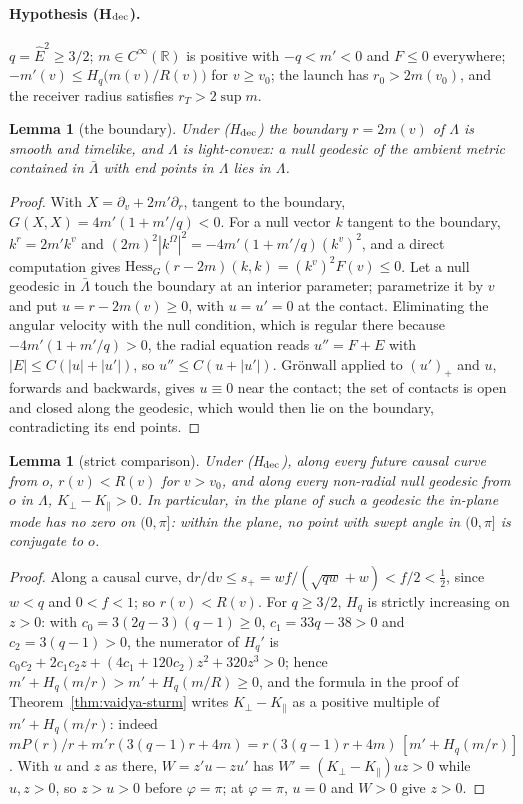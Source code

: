 \documentclass[aip,jmp,amsmath,amssymb,reprint]{revtex4-2}
\newcommand{\Ehat}{\hat E}
\newcommand{\dd}{\mathrm{d}}
\theoremstyle{plain}
\newtheorem{lemma}[proposition]{Lemma}
\theoremstyle{definition}
\begin{document}
\paragraph{Hypothesis (H$_{\rm dec}$).} $q=\Ehat^2\ge3/2$; $m\in C^\infty(\mathbb R)$ is positive with
$-q<m'<0$ and $F\le0$ everywhere; $-m'(v)\le H_q\big(m(v)/R(v)\big)$ for $v\ge v_0$; the launch has
$r_0>2m(v_0)$, and the receiver radius satisfies $r_T>2\sup m$.

\begin{lemma}[the boundary]\label{lem:vaidya-dec-boundary}
Under (H$_{\rm dec}$) the boundary $r=2m(v)$ of $\Lambda$ is smooth and timelike, and $\Lambda$ is light-convex: a
null geodesic of the ambient metric contained in $\bar\Lambda$ with end points in $\Lambda$ lies in $\Lambda$.
\end{lemma}

\begin{proof}
With $X=\partial_v+2m'\partial_r$, tangent to the boundary, $G(X,X)=4m'(1+m'/q)<0$. For a null vector $k$
tangent to the boundary, $k^r=2m'k^v$ and $(2m)^2|k^\Omega|^2=-4m'(1+m'/q)(k^v)^2$, and a direct
computation gives $\mathrm{Hess}_G(r-2m)(k,k)=(k^v)^2F(v)\le0$. Let a null geodesic in $\bar\Lambda$ touch the
boundary at an interior parameter; parametrize it by $v$ and put $u=r-2m(v)\ge0$, with $u=u'=0$ at
the contact. Eliminating the angular velocity with the null condition, which is regular there
because $-4m'(1+m'/q)>0$, the radial equation reads $u''=F+E$ with $|E|\le C(|u|+|u'|)$, so
$u''\le C(u+|u'|)$. Gr\"onwall applied to $(u')_+$ and $u$, forwards and backwards, gives $u\equiv0$
near the contact; the set of contacts is open and closed along the geodesic, which would then lie
on the boundary, contradicting its end points.
\end{proof}

\begin{lemma}[strict comparison]\label{lem:vaidya-dec-sturm}
Under (H$_{\rm dec}$), along every future causal curve from $o$, $r(v)<R(v)$ for $v>v_0$, and along every
non-radial null geodesic from $o$ in $\Lambda$, $K_\perp-K_\parallel>0$. In particular, in the plane of such a
geodesic the in-plane mode has no zero on $(0,\pi]$: within the plane, no point with swept angle
in $(0,\pi]$ is conjugate to $o$.
\end{lemma}

\begin{proof}
Along a causal curve, $\dd r/\dd v\le s_+=wf/(\sqrt{qw}+w)<f/2<\frac12$, since $w<q$ and $0<f<1$; so
$r(v)<R(v)$. For $q\ge3/2$, $H_q$ is strictly increasing on $z>0$: with $c_0=3(2q-3)(q-1)\ge0$, $c_1=33q-38>0$ and
$c_2=3(q-1)>0$, the numerator of $H_q'$ is $c_0c_2+2c_1c_2z+(4c_1+120c_2)z^2+320z^3>0$; hence
$m'+H_q(m/r)>m'+H_q(m/R)\ge0$, and the formula in the proof of Theorem~\ref{thm:vaidya-sturm}
writes $K_\perp-K_\parallel$ as a positive multiple of $m'+H_q(m/r)$: indeed
$mP(r)/r+m'r(3(q-1)r+4m)=r(3(q-1)r+4m)\,[m'+H_q(m/r)]$. With $u$ and $z$ as there, $W=z'u-zu'$ has
$W'=(K_\perp-K_\parallel)uz>0$ while $u,z>0$, so $z>u>0$ before $\varphi=\pi$; at $\varphi=\pi$, $u=0$ and $W>0$
give $z>0$.
\end{proof}
\end{document}
